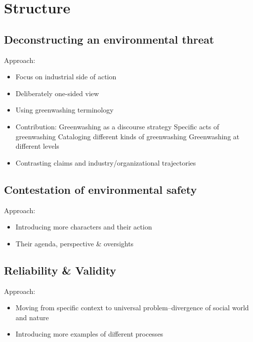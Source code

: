 
\medskip

\section*{Structure}

\subsection*{Deconstructing an environmental threat}

Approach: 

\begin{itemize}
	\item Focus on industrial side of action
	\item Deliberately one-sided view
	\item Using greenwashing terminology
	\item Contribution: Greenwashing as a discourse strategy
		\subitem Specific acts of greenwashing
		\subitem Cataloging different kinds of greenwashing
		\subitem Greenwashing at different levels
	\item Contrasting claims and industry/organizational trajectories
\end{itemize}



\subsection*{Contestation of environmental safety}

Approach:

\begin{itemize}
	\item Introducing more characters and their action
	\item Their agenda, perspective \& oversights
\end{itemize}

\subsection*{Reliability \& Validity}

Approach:

\begin{itemize}
	\item Moving from specific context to universal problem--divergence of social world and nature
	\item Introducing more examples of different processes
\end{itemize}
